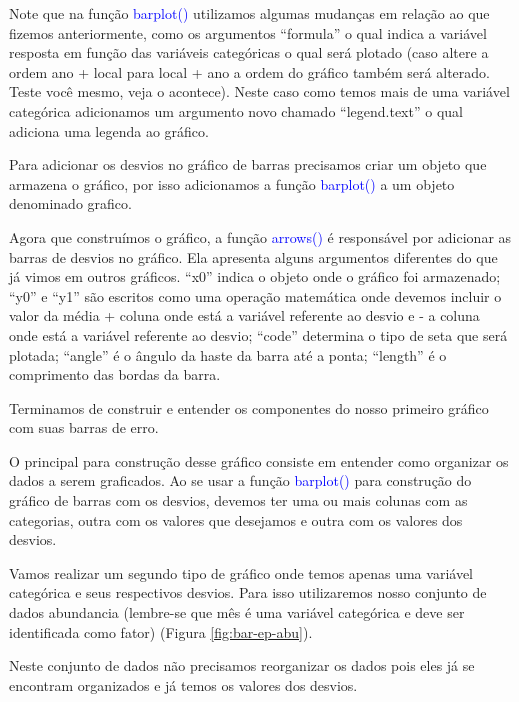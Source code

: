 \documentclass[14pt,titlepage, oneside, openany, a4paper]{book}
\begin{document}
Note que na função \textcolor{blue}{barplot()} utilizamos algumas mudanças em relação ao que fizemos anteriormente, como os argumentos ``formula'' o qual indica a variável resposta em função das variáveis categóricas o qual será plotado (caso altere a ordem ano + local para local + ano a ordem do gráfico também será alterado. Teste você mesmo, veja o acontece). Neste caso como temos mais de uma variável categórica adicionamos um argumento novo chamado ``legend.text'' o qual adiciona uma legenda ao gráfico.

Para adicionar os desvios no gráfico de barras precisamos criar um objeto que armazena o gráfico, por isso adicionamos a função \textcolor{blue}{barplot()} a um objeto denominado grafico.

Agora que construímos o gráfico, a função \textcolor{blue}{arrows()} é responsável por adicionar as barras de desvios no gráfico. Ela apresenta alguns argumentos diferentes do que já vimos em outros gráficos. ``x0'' indica o objeto onde o gráfico foi armazenado; ``y0'' e ``y1'' são escritos como uma operação matemática onde devemos incluir o valor da média + coluna onde está a variável referente ao desvio e - a coluna onde está a variável referente ao desvio; ``code'' determina o tipo de seta que será plotada; ``angle'' é o ângulo da haste da barra até a ponta; ``length'' é o comprimento das bordas da barra.

Terminamos de construir e entender os componentes do nosso primeiro gráfico com suas barras de erro.

O principal para construção desse gráfico consiste em entender como organizar os dados a serem graficados. Ao se usar a função \textcolor{blue}{barplot()} para construção do gráfico de barras com os desvios, devemos ter uma ou mais colunas com as categorias, outra com os valores que desejamos e outra com os valores dos desvios.

Vamos realizar um segundo tipo de gráfico onde temos apenas uma variável categórica e seus respectivos desvios. Para isso utilizaremos nosso conjunto de dados abundancia (lembre-se que mês é uma variável categórica e deve ser identificada como fator) (Figura \ref{fig:bar-ep-abu}).

Neste conjunto de dados não precisamos reorganizar os dados pois eles já se encontram organizados e já temos os valores dos desvios.
\end{document}
